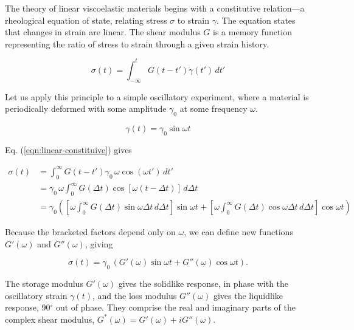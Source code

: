 The theory of linear viscoelastic materials begins with a constitutive relation---a rheological equation of state, relating stress $\sigma$ to strain $\gamma$. The equation states that changes in strain are linear. The shear modulus $G$ is a memory function representing the ratio of stress to strain through a given strain history.

\begin{equation}
  \label{eqn:linear-constituive}
  \sigma(t) = \int_{-\infty}^t G(t - t')\dot{\gamma}(t')\, dt'
\end{equation}

\noindent Let us apply this principle to a simple oscillatory experiment, where a material is periodically deformed with some amplitude $\gamma_0$ at some frequency $\omega$.

\begin{equation}
  \gamma(t) = \gamma_0 \sin \omega t
\end{equation}

\noindent Eq. (\ref{eqn:linear-constituive}) gives

\begin{equation}
  \begin{aligned}
    \sigma(t) &= \int_0^\infty G(t - t') \gamma_0\,\omega \cos(\omega t')\, dt'\\
    &= \gamma_0\,\omega \int_0^\infty G(\Delta t) \cos[\omega (t - \Delta t)]\, d\Delta t\\
    &= \gamma_0 \left(\left[\omega \int_0^\infty G(\Delta t) \sin \omega \Delta t\, d\Delta t \right] \sin \omega t + \left[\omega \int_0^\infty G(\Delta t) \cos \omega \Delta t\, d\Delta t \right] \cos \omega t \right)
  \end{aligned}
\end{equation}

Because the bracketed factors depend only on $\omega$, we can define new functions $G'(\omega)$ and $G''(\omega)$, giving

\begin{equation}
  \sigma(t) = \gamma_0\, (G'(\omega) \sin \omega t + G''(\omega) \cos \omega t).
\end{equation}

The storage modulus $G'(\omega)$ gives the solidlike response, in phase with the oscillatory strain $\gamma(t)$, and the loss modulus $G''(\omega)$ gives the liquidlike response, 90$^\circ$ out of phase. They comprise the real and imaginary parts of the complex shear modulus, $G^*(\omega) = G'(\omega) + iG''(\omega)$.

